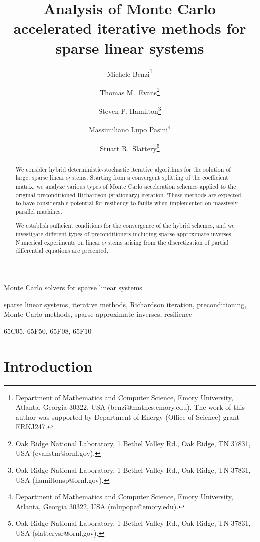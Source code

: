 \documentclass[final,leqno,onefignum,onetabnum]{siamltex1213}
\title{Analysis of Monte Carlo accelerated iterative methods for
sparse linear systems \tnoteref{ornl-cr}}
\author{Michele Benzi\thanks{Department of Mathematics and Computer
Science, Emory University, Atlanta, Georgia 30322, USA
(benzi@mathcs.emory.edu). The work of this author was supported
by Department of Energy (Office of Science) grant ERKJ247.}
\and
Thomas M.~Evans\thanks{Oak Ridge National Laboratory, 1 Bethel Valley Rd.,
Oak Ridge, TN 37831, USA (evanstm@ornl.gov).}
\and Steven P. Hamilton\thanks{Oak Ridge National Laboratory,
1 Bethel Valley Rd., Oak Ridge, TN 37831, USA (hamiltonsp@ornl.gov).}
\and
\linebreak Massimiliano Lupo  Pasini\thanks{Department of Mathematics and Computer
Science, Emory University, Atlanta, Georgia 30322, USA (mlupopa@emory.edu).}
\and
Stuart R.~Slattery\thanks{Oak Ridge National Laboratory,
1 Bethel Valley Rd., Oak Ridge, TN 37831, USA (slatterysr@ornl.gov).}
}
\date{}
\begin{document}


\pagestyle{myheadings}
{Monte Carlo solvers for sparse linear systems}

\maketitle

\begin{abstract}
We consider hybrid deterministic-stochastic iterative algorithms for the solution
of large, sparse linear systems. Starting from a convergent splitting of the
coefficient matrix, we analyze various types of Monte Carlo acceleration schemes
applied to the original preconditioned Richardson (stationary) iteration. These
methods are expected to have considerable potential for resiliency to faults
when implemented on massively parallel machines.

We establish sufficient conditions for the convergence of the hybrid schemes, and
we investigate different types of preconditioners including sparse approximate
inverses. Numerical experiments on linear systems arising from the discretization
of partial differential equations are presented.
\end{abstract}

\begin{keywords}
sparse linear systems, iterative methods, Richardson iteration, preconditioning,
Monte Carlo methods, sparse approximate inverses, resilience
\end{keywords}

\begin{AMS}
65C05, 65F50, 65F08, 65F10
\end{AMS}


\section{Introduction}
\label{sec:intro}
\end{document}
